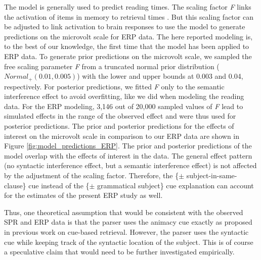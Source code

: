 \documentclass[a4paper, man, floatsintext]{apa7}
\begin{document}
The \citet{Lewis2005} model is generally used to predict reading times. The scaling factor \textit{F} links the activation of items in memory to retrieval times \citep{Lewis2005}. But this scaling factor can be adjusted to link activation to brain responses to use the model to generate predictions on the microvolt scale for ERP data. The here reported modeling is, to the best of our knowledge, the first time that the \citet{Lewis2005} model has been applied to ERP data. To generate prior predictions on the microvolt scale, we sampled the free scaling parameter \textit{F} from a truncated normal prior distribution ($Normal_+(0.01, 0.005)$) with the lower and upper bounds at 0.003 and 0.04, respectively. For posterior predictions, we fitted \textit{F} only to the semantic interference effect to avoid overfitting, like we did when modeling the reading data. For the ERP modeling, 3,146 out of 20,000 sampled values of \textit{F} lead to simulated effects in the range of the observed effect and were thus used for posterior predictions. The prior and posterior predictions for the effects of interest on the microvolt scale in comparison to our ERP data are shown in Figure \ref{fig:model_predictions_ERP}. The prior and posterior predictions of the model overlap with the effects of interest in the data. The general effect pattern (no syntactic interference effect, but a semantic interference effect) is not affected by the adjustment of the scaling factor. Therefore, the \{$\pm$ subject-in-same-clause\} cue instead of the \{$\pm$ grammatical subject\} cue explanation can account for the estimates of the present ERP study as well.

Thus, one theoretical assumption that would be consistent with the observed SPR and ERP data is that the parser uses the animacy cue exactly as proposed in previous work on cue-based retrieval. However, the parser uses the syntactic cue while keeping track of the syntactic location of the subject. This is of course a speculative claim that would need to be further investigated empirically. 


\end{document}
